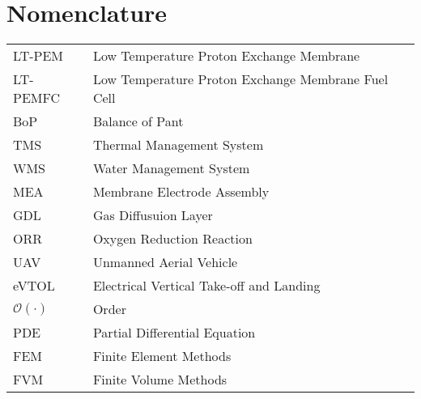 \section{Nomenclature}

 {
  \renewcommand\arraystretch{1.0}
  \noindent\begin{longtable*}{@{}l @{\quad=\quad} l@{}}
	  LT-PEM  & Low Temperature Proton Exchange Membrane \\
	  LT-PEMFC  & Low Temperature Proton Exchange Membrane Fuel Cell\\
	  BoP &    Balance of Pant \\
	  TMS & Thermal Management System \\
	  WMS & Water Management System \\
	  MEA & Membrane Electrode Assembly \\
	  GDL & Gas Diffusuion Layer \\
	  ORR & Oxygen Reduction Reaction \\
	  UAV & Unmanned Aerial Vehicle \\
	  eVTOL & Electrical Vertical Take-off and Landing\\
	  $\mathcal{O}(\cdot)$ & Order \\
	  PDE & Partial Differential Equation \\
	  FEM & Finite Element Methods\\
	  FVM & Finite Volume Methods \\
  \end{longtable*}
 }

